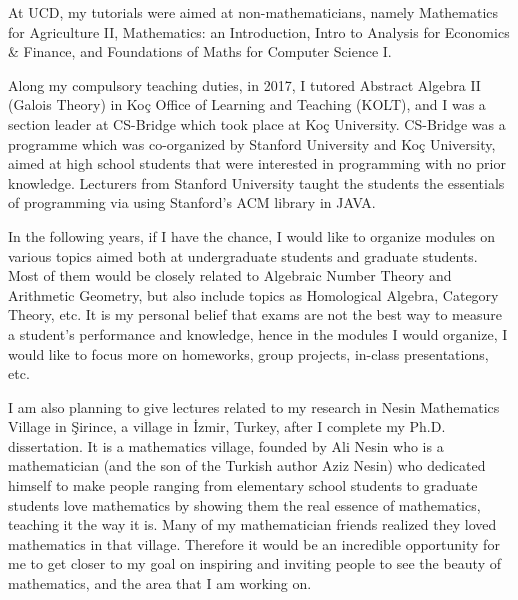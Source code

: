\documentclass{article}
\begin{document}
\vspace{5mm}

\par At UCD, my tutorials were aimed at non-mathematicians, namely Mathematics for Agriculture II, Mathematics: an Introduction, Intro to Analysis for Economics \& Finance, and Foundations of Maths for Computer Science I. 

\vspace{5mm}

\par Along my compulsory teaching duties, in 2017, I tutored Abstract Algebra II (Galois Theory) in Koç Office of Learning and Teaching (KOLT), and I was a section leader at CS-Bridge which took place at Koç University. CS-Bridge was a programme which was co-organized by Stanford University and Koç University, aimed at high school students that were interested in programming with no prior knowledge. Lecturers from Stanford University taught the students the essentials of programming via using Stanford's ACM library in JAVA.

\vspace{5mm}

\par In the following years, if I have the chance, I would like to organize modules on various topics aimed both at undergraduate students and graduate students. Most of them would be closely related to Algebraic Number Theory and Arithmetic Geometry, but also include topics as Homological Algebra, Category Theory, etc. It is my personal belief that exams are not the best way to measure a student's performance and knowledge, hence in the modules I would organize, I would like to focus more on homeworks, group projects, in-class presentations, etc.

\vspace{5mm}

\par I am also planning to give lectures related to my research in Nesin Mathematics Village in Şirince, a village in İzmir, Turkey, after I complete my Ph.D. dissertation. It is a mathematics village, founded by Ali Nesin who is a mathematician (and the son of the Turkish author Aziz Nesin) who dedicated himself to make people ranging from elementary school students to graduate students love mathematics by showing them the real essence of mathematics, teaching it the way it is. Many of my mathematician friends realized they loved mathematics in that village. Therefore it would be an incredible opportunity for me to get closer to my goal on inspiring and inviting people to see the beauty of mathematics, and the area that I am working on.
\end{document}
